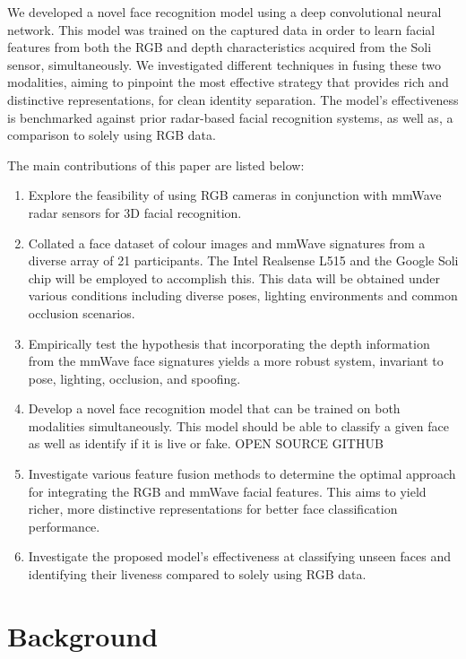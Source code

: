 \documentclass{mpaper}
\begin{document}
We developed a novel face recognition model using a deep convolutional neural network. This model was trained on the captured data in order to learn facial features from both the RGB and depth characteristics acquired from the Soli sensor, simultaneously. We investigated different techniques in fusing these two modalities, aiming to pinpoint the most effective strategy that provides rich and distinctive representations, for clean identity separation. The model's effectiveness is benchmarked against prior radar-based facial recognition systems, as well as, a comparison to solely using RGB data.

The main contributions of this paper are listed below:

\begin{enumerate}
    \item Explore the feasibility of using RGB cameras in conjunction with mmWave radar sensors for 3D facial recognition.
    \item Collated a face dataset of colour images and mmWave signatures from a diverse array of 21 participants. The Intel Realsense L515 \cite{intel-l515} and the Google Soli chip \cite{lien2016soli} will be employed to accomplish this. This data will be obtained under various conditions including diverse poses, lighting environments and common occlusion scenarios.
    \item Empirically test the hypothesis that incorporating the depth information from the mmWave face signatures yields a more robust system, invariant to pose, lighting, occlusion, and spoofing.
    \item Develop a novel face recognition model that can be trained on both modalities simultaneously. This model should be able to classify a given face as well as identify if it is live or fake. OPEN SOURCE GITHUB
    \item Investigate various feature fusion methods to determine the optimal approach for integrating the RGB and mmWave facial features. This aims to yield richer, more distinctive representations for better face classification performance.
    \item Investigate the proposed model's effectiveness at classifying unseen faces and identifying their liveness compared to solely using RGB data.
\end{enumerate}



\section{Background}
\end{document}
